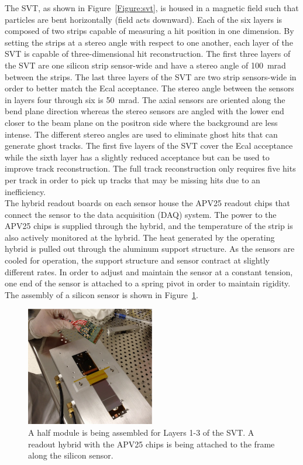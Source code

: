 The SVT, as shown in Figure~\ref{Figure:svt}, is housed in a magnetic field such that particles are bent horizontally (field acts downward). Each of the six layers is composed of two strips capable of measuring a hit position in one dimension. By setting the strips at a stereo angle with respect to one another, each layer of the SVT is capable of three-dimensional hit reconstruction. The first three layers of the SVT are one silicon strip sensor-wide and have a stereo angle of 100~mrad between the strips. The last three layers of the SVT are two strip sensors-wide in order to better match the Ecal acceptance. The stereo angle between the sensors in layers four through six is 50~mrad. The axial sensors are oriented along the bend plane direction whereas the stereo sensors are angled with the lower end closer to the beam plane on the positron side where the background are less intense. The different stereo angles are used to eliminate ghost hits that can generate ghost tracks. The first five layers of the SVT cover the Ecal acceptance while the sixth layer has a slightly reduced acceptance but can be used to improve track reconstruction. The full track reconstruction only requires five hits per track in order to pick up tracks that may be missing hits due to an inefficiency. \\
\indent The hybrid readout boards on each sensor house the APV25 readout chips that connect the sensor to the data acquisition (DAQ) system. The power to the APV25 chips is supplied through the hybrid, and the temperature of the strip is also actively monitored at the hybrid. The heat generated by the operating hybrid is pulled out through the aluminum support structure. As the sensors are cooled for operation, the support structure and sensor contract at slightly different rates. In order to adjust and maintain the sensor at a constant tension, one end of the sensor is attached to a spring pivot in order to maintain rigidity. The assembly of a silicon sensor is shown in Figure~\ref{Figure:svtAssembly}.
\begin{figure}[H]
  \centering
      \includegraphics[width=0.5\textwidth]{pics/experiment/svtSensorAssembly.png}
  \caption[Assembly of a half module of the SVT ]{A half module is being assembled for Layers 1-3 of the SVT. A readout hybrid with the APV25 chips is being attached to the frame along the silicon sensor.~\cite{collaboration_heavy_2013}}
  \label{Figure:svtAssembly}
\end{figure}
